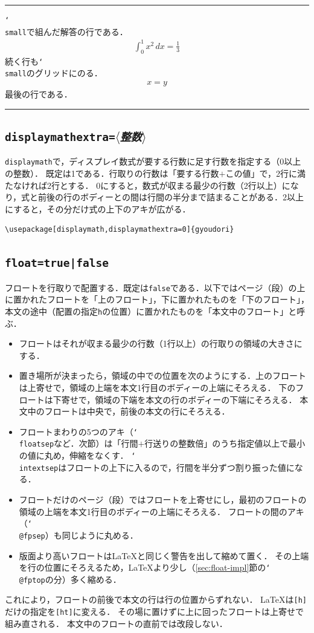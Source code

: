 \documentclass[paper=a4,dvipdfmx]{jlreq}
\newcommand\opt[1]{\texttt{#1}}
\newcommand\cs[1]{\texttt{\char`\\#1}}
\newcommand\meta[1]{$\langle$\textit{#1}$\rangle$}
\newenvironment{demo}
  {\par\medskip\noindent
   \begin{minipage}{\linewidth}\hrule\smallskip}
  {\par\smallskip\hrule\end{minipage}\par\medskip}
\begin{document}
\begin{demo}
\small{}\cs{small}で組んだ解答の行である．
\begin{gather*}
  \int_0^1 x^2\,dx = \frac{1}{3}
\end{gather*}
続く行も\cs{small}のグリッドにのる．
\begin{gather*}
  x = y
\end{gather*}
最後の行である．
\end{demo}

\subsection{\opt{displaymathextra=\meta{整数}}}
\label{sec:displaymathextra}

\opt{displaymath}で，ディスプレイ数式が要する行数に足す行数を指定する（0以上の整数）．
既定は1である．行取りの行数は「要する行数$+$この値」で，2行に満たなければ2行とする．
0にすると，数式が収まる最少の行数（2行以上）になり，式と前後の行のボディーとの間は行間の半分まで詰まることがある．2以上にすると，その分だけ式の上下のアキが広がる．
\begin{verbatim}
\usepackage[displaymath,displaymathextra=0]{gyoudori}
\end{verbatim}

\subsection{\opt{float=true|false}}
\label{sec:float}

フロートを行取りで配置する．既定は\opt{false}である．以下ではページ（段）の上に置かれたフロートを「上のフロート」，下に置かれたものを「下のフロート」，本文の途中（配置の指定\opt{h}の位置）に置かれたものを「本文中のフロート」と呼ぶ．
\begin{itemize}
\item フロートはそれが収まる最少の行数（1行以上）の行取りの領域の大きさにする．
\item 置き場所が決まったら，領域の中での位置を次のようにする．上のフロートは上寄せで，領域の上端を本文1行目のボディーの上端にそろえる．
 下のフロートは下寄せで，領域の下端を本文の行のボディーの下端にそろえる．
 本文中のフロートは中央で，前後の本文の行にそろえる．
\item フロートまわりの5つのアキ（\cs{floatsep}など．次節）は「行間$+$行送りの整数倍」のうち指定値以上で最小の値に丸め，伸縮をなくす．
 \cs{intextsep}はフロートの上下に入るので，行間を半分ずつ割り振った値になる．
\item フロートだけのページ（段）ではフロートを上寄せにし，最初のフロートの領域の上端を本文1行目のボディーの上端にそろえる．
 フロートの間のアキ（\cs{@fpsep}）も同じように丸める．
\item 版面より高いフロートは\LaTeX{}と同じく警告を出して縮めて置く．
 その上端を行の位置にそろえるため，\LaTeX{}より少し（\ref{sec:float-impl}\nobreak 節の\cs{@fptop}の分）多く縮める．
\end{itemize}
これにより，フロートの前後で本文の行は行の位置からずれない．
\LaTeX{}は\opt{[h]}だけの指定を\opt{[ht]}に変える．
その場に置けずに上に回ったフロートは上寄せで組み直される．
本文中のフロートの直前では改段しない．
\end{document}
